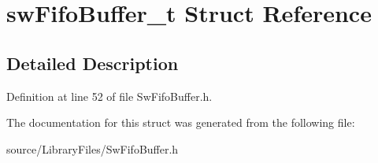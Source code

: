 \hypertarget{structsw_fifo_buffer__t}{}\section{sw\+Fifo\+Buffer\+\_\+t Struct Reference}
\label{structsw_fifo_buffer__t}


\subsection{Detailed Description}


Definition at line 52 of file Sw\+Fifo\+Buffer.\+h.



The documentation for this struct was generated from the following file\+:\begin{DoxyCompactItemize}
\item 
source/\+Library\+Files/Sw\+Fifo\+Buffer.\+h\end{DoxyCompactItemize}
